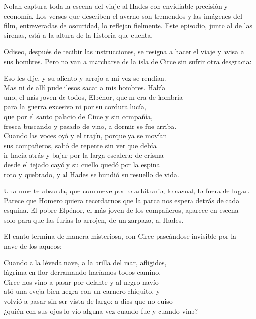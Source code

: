 Nolan captura toda la escena del viaje al Hades con envidiable precisión y economía. Los versos que describen el averno son tremendos y las imágenes del film, entreveradas de oscuridad, lo reflejan fielmente. Este episodio, junto al de las sirenas, está a la altura de la historia que cuenta.

Odiseo, después de recibir las instrucciones, se resigna a hacer el viaje y avisa a sus hombres. Pero no van a marcharse de la isla de Circe sin sufrir otra desgracia:

\begin{versocita}
Eso les dije, y su aliento y arrojo a mi voz se rendían.\\
Mas ni de allí pude ilesos sacar a mis hombres. Había\\
uno, el más joven de todos, Elpénor, que ni era de hombría\\
para la guerra excesivo ni por su cordura lucía,\\
que por el santo palacio de Circe y sin compañía,\\
fresca buscando y pesado de vino, a dormir se fue arriba.\\
Cuando las voces oyó y el trajín, porque ya se movían\\
sus compañeros, saltó de repente sin ver que debía\\
ir hacia atrás y bajar por la larga escalera: de crisma\\
desde el tejado cayó y su cuello quedó por la espina\\
roto y quebrado, y al Hades se hundió su resuello de vida.
\end{versocita}

Una muerte absurda, que conmueve por lo arbitrario, lo casual, lo fuera de lugar. Parece que Homero quiera recordarnos que la parca nos espera detrás de cada esquina. El pobre Elpénor, el más joven de los compañeros, aparece en escena solo para que las furias lo arrojen, de un zarpazo, al Hades.

El canto termina de manera misteriosa, con Circe paseándose invisible por la nave de los aqueos:

\begin{versocita}
Cuando a la léveda nave, a la orilla del mar, afligidos,\\
lágrima en flor derramando hacíamos todos camino,\\
Circe nos vino a pasar por delante y al negro navío\\
ató una oveja bien negra con un carnero chiquito, y\\
volvió a pasar sin ser vista de largo: a dios que no quiso\\
¿quién con sus ojos lo vio alguna vez cuando fue y cuando vino?
\end{versocita}

